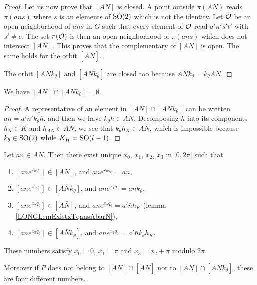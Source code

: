 \begin{proof}
	Let us now prove that $[AN]$ is closed. A point outside $\pi(AN)$ reads $\pi(ans)$ where $s$ is an elements of $\operatorname{SO}(2)$ which is not the identity. Let $\mathcal{O}$ be an open neighborhood of $ans$ in $G$ such that every element of $\mathcal{O}$ read $a'n's't'$ with $s'\neq e$. The set $\pi(\mathcal{O})$ is then an open neighborhood of $\pi(ans)$ which does not intersect $[AN]$. This proves that the complementary of $[AN]$ is open. The same holds for the orbit $[A\bar N]$.
	
	The orbit $[ANk_{\theta}]$ and $[A\bar Nk_{\theta}]$ are closed too because $ANk_{\theta}=k_{\theta}A\bar N$.

\end{proof}

%
\begin{lemma}
	We have $[AN]\cap[ANk_{\theta}]=\emptyset$.
\end{lemma}

\begin{proof}
	A representative of an element in $[AN]\cap[ANk_{\theta}]$ can be written $an=a'n'k_{\theta}h$, and then we have $k_{\theta}h\in AN$. Decomposing $h$ into its components $h_K\in K$ and $h_{AN}\in AN$, we see that $k_{\theta}h_K\in AN$, which is impossible because $k_{\theta}\in\operatorname{SO}(2)$ while $K_H=\operatorname{SO}(l-1)$.
\end{proof}

\begin{proposition}		\label{LONGPropUniquexxxxANANbarktheta}
	Let $an\in AN$. Then there exist unique $x_0$, $x_1$, $x_2$, $x_3$ in $\mathopen[ 0 , 2\pi [$ such that
	\begin{enumerate}
		\item
			$[an e^{x_0q_0}]\in[AN]$, and $an e^{x_0q_0}=an$,
		\item
			$[an e^{x_1q_0}]\in[ANk_{\theta}]$, and $an e^{x_1q_0}=ank_{\theta}$,
		\item
			$[an e^{x_2q_0}]\in[A\bar N]$, and $an e^{x_2q_0}=a'\bar n h_K$ (lemma \ref{LONGLemExistxTqansAbarN}),
		\item
			$[an e^{x_3q_0}]\in[A\bar Nk_{\theta}]$, and $an e^{x_3q_0}=a'\bar nk_{\theta}h_K$.
	\end{enumerate}
	These numbers satisfy $x_0=0$, $x_1=\pi$ and $x_3=x_2+\pi$ modulo $2\pi$. 

	Moreover if $P$ does not belong to $[AN]\cap[A\bar N]$ nor to $[AN]\cap[A\bar Nk_{\theta}]$, these are four different numbers.
\end{proposition}

